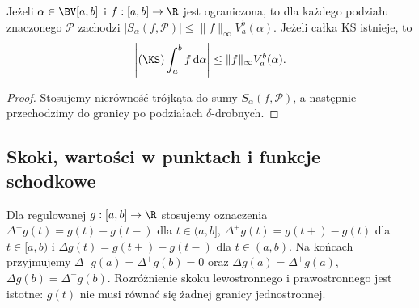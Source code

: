 \begin{lemat}
\label{lem:ks-var}
Jeżeli $\alpha\in\BV[a,b]$ i $f:[a,b]\to\R$ jest ograniczona, to dla każdego podziału znaczonego $\mathcal P$ zachodzi $|S_\alpha(f,\mathcal P)|\le\|f\|_\infty V_a^b(\alpha)$. Jeżeli całka KS istnieje, to
\[
 \left|(\KS)\int_a^b f\,\mathrm d\alpha\right|\le\|f\|_\infty V_a^b(\alpha).
\]
\end{lemat}
\begin{proof}
Stosujemy nierówność trójkąta do sumy $S_\alpha(f,\mathcal P)$, a następnie przechodzimy do granicy po podziałach $\delta$-drobnych.
\end{proof}

\subsection*{Skoki, wartości w punktach i funkcje schodkowe}
Dla regulowanej $g:[a,b]\to\R$ stosujemy oznaczenia $\Delta^-g(t)=g(t)-g(t-)$ dla $t\in(a,b]$, $\Delta^+g(t)=g(t+)-g(t)$ dla $t\in[a,b)$ i $\Delta g(t)=g(t+)-g(t-)$ dla $t\in(a,b)$. Na końcach przyjmujemy $\Delta^-g(a)=\Delta^+g(b)=0$ oraz $\Delta g(a)=\Delta^+g(a)$, $\Delta g(b)=\Delta^-g(b)$. Rozróżnienie skoku lewostronnego i prawostronnego jest istotne: $g(t)$ nie musi równać się żadnej granicy jednostronnej.

